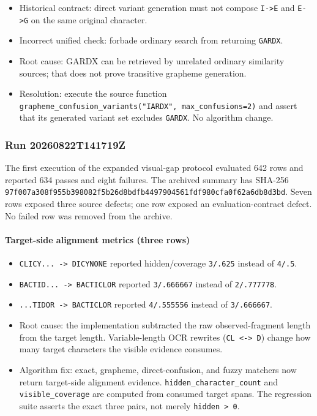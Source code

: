 \begin{itemize}
\tightlist
\item
  Historical contract: direct variant generation must not compose \texttt{I-\textgreater{}E} and
  \texttt{E-\textgreater{}G} on the same original character.
\item
  Incorrect unified check: forbade ordinary search from returning \texttt{GARDX}.
\item
  Root cause: GARDX can be retrieved by unrelated ordinary similarity sources;
  that does not prove transitive grapheme generation.
\item
  Resolution: execute the source function
  \texttt{grapheme\_confusion\_variants("IARDX",\ max\_confusions=2)} and assert that its
  generated variant set excludes \texttt{GARDX}. No algorithm change.
\end{itemize}

\subsubsection{Run 20260822T141719Z}\label{run-20260822t141719z}

The first execution of the expanded visual-gap protocol evaluated 642 rows and
reported 634 passes and eight failures. The archived summary has SHA-256
\texttt{97f007a308f955b398082f5b26d8bdfb4497904561fdf980cfa0f62a6db8d3bd}.
Seven rows exposed three source defects; one row exposed an evaluation-contract
defect. No failed row was removed from the archive.

\paragraph{Target-side alignment metrics (three rows)}\label{target-side-alignment-metrics-three-rows}

\begin{itemize}
\tightlist
\item
  \texttt{CLICY...\ -\textgreater{}\ DICYNONE} reported hidden/coverage \texttt{3/.625} instead of \texttt{4/.5}.
\item
  \texttt{BACTID...\ -\textgreater{}\ BACTICLOR} reported \texttt{3/.666667} instead of \texttt{2/.777778}.
\item
  \texttt{...TIDOR\ -\textgreater{}\ BACTICLOR} reported \texttt{4/.555556} instead of \texttt{3/.666667}.
\item
  Root cause: the implementation subtracted the raw observed-fragment length
  from the target length. Variable-length OCR rewrites (\texttt{CL\ \textless{}-\textgreater{}\ D}) change how
  many target characters the visible evidence consumes.
\item
  Algorithm fix: exact, grapheme, direct-confusion, and fuzzy matchers now
  return target-side alignment evidence. \texttt{hidden\_character\_count} and
  \texttt{visible\_coverage} are computed from consumed target spans. The regression
  suite asserts the exact three pairs, not merely \texttt{hidden\ \textgreater{}\ 0}.
\end{itemize}

